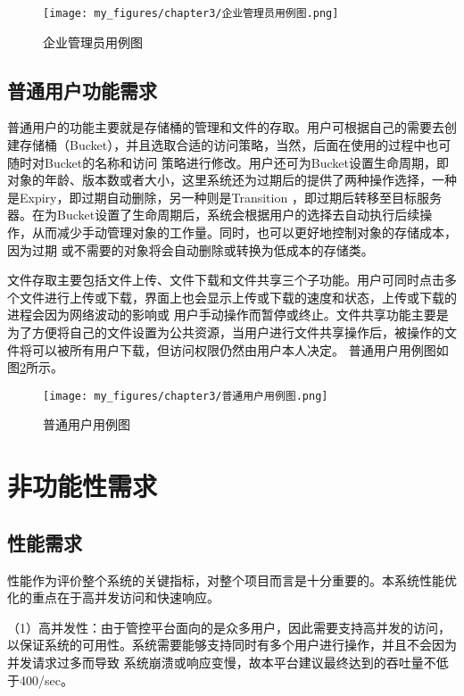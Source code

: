 \begin{figure}[h]
    \centering
    \texttt{[image: my\_figures/chapter3/企业管理员用例图.png]}
    \caption{企业管理员用例图} 
    \label{fig:企业管理员用例图}
\end{figure}

\subsection{普通用户功能需求}

普通用户的功能主要就是存储桶的管理和文件的存取。用户可根据自己的需要去创建存储桶（Bucket），并且选取合适的访问策略，当然，后面在使用的过程中也可随时对Bucket的名称和访问
策略进行修改。用户还可为Bucket设置生命周期，即对象的年龄、版本数或者大小，这里系统还为过期后的提供了两种操作选择，一种是Expiry，即过期自动删除，另一种则是Transition
，即过期后转移至目标服务器\cite{ko23i}。在为Bucket设置了生命周期后，系统会根据用户的选择去自动执行后续操作\cite{koyeji}，从而减少手动管理对象的工作量。同时，也可以更好地控制对象的存储成本，因为过期
或不需要的对象将会自动删除或转换为低成本的存储类。

文件存取主要包括文件上传、文件下载和文件共享三个子功能。用户可同时点击多个文件进行上传或下载，界面上也会显示上传或下载的速度和状态，上传或下载的进程会因为网络波动的影响或
用户手动操作而暂停或终止。文件共享功能主要是为了方便将自己的文件设置为公共资源，当用户进行文件共享操作后，被操作的文件将可以被所有用户下载，但访问权限仍然由用户本人决定。
普通用户用例图如图\ref{fig:普通用户用例图}所示。

\begin{figure}[h]
    \centering
    \texttt{[image: my\_figures/chapter3/普通用户用例图.png]}
    \caption{普通用户用例图} 
    \label{fig:普通用户用例图}

\end{figure}

\section{非功能性需求}

\subsection{性能需求}

性能作为评价整个系统的关键指标，对整个项目而言是十分重要的。本系统性能优化的重点在于高并发访问和快速响应。

（1）高并发性：由于管控平台面向的是众多用户，因此需要支持高并发的访问，以保证系统的可用性。系统需要能够支持同时有多个用户进行操作，并且不会因为并发请求过多而导致
系统崩溃或响应变慢，故本平台建议最终达到的吞吐量不低于400/sec。

